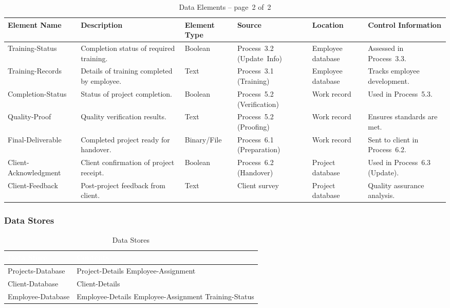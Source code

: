\documentclass[12pt,a4paper]{article}
\begin{document}
\newpage

\begin{table}[H]
\centering
\begin{tabular}{|p{2.8cm}|p{4cm}|p{1.8cm}|p{2.3cm}|p{1.8cm}|p{2.5cm}|}
\hline
\rowcolor{tableheader}
\textcolor{headertext}{\textbf{Element Name}} &
\textcolor{headertext}{\textbf{Description}} &
\textcolor{headertext}{\textbf{Element Type}} &
\textcolor{headertext}{\textbf{Source}} &
\textcolor{headertext}{\textbf{Location}} &
\textcolor{headertext}{\textbf{Control Information}} \\
\hline
Training-Status & Completion status of required training. & Boolean & Process 3.2 (Update Info) & Employee database & Assessed in Process 3.3. \\
\hline
Training-Records & Details of training completed by employee. & Text & Process 3.1 (Training) & Employee database & Tracks employee development. \\
\hline
Completion-Status & Status of project completion. & Boolean & Process 5.2 (Verification) & Work record & Used in Process 5.3. \\
\hline
Quality-Proof & Quality verification results. & Text & Process 5.2 (Proofing) & Work record & Ensures standards are met. \\
\hline
Final-Deliverable & Completed project ready for handover. & Binary/File & Process 6.1 (Preparation) & Work record & Sent to client in Process 6.2. \\
\hline
Client-Acknowledgment & Client confirmation of project receipt. & Boolean & Process 6.2 (Handover) & Project database & Used in Process 6.3 (Update). \\
\hline
Client-Feedback & Post-project feedback from client. & Text & Client survey & Project database & Quality assurance analysis. \\
\hline
\end{tabular}
\caption{Data Elements – page 2 of 2}
\label{tab:data_elements_part2}
\end{table}


\subsubsection{Data Stores}

\begin{table}[H]
\centering
\begin{tabular}{|p{4cm}|p{9cm}|}
\hline
\rowcolor{headercolor}
\textcolor{white}{\textbf{Data Store}} & \textcolor{white}{\textbf{Contents}} \\
\hline
Projects-Database & Project-Details \newline Employee-Assignment \\
\hline
Client-Database & Client-Details \\
\hline
Employee-Database & Employee-Details \newline Employee-Assignment \newline Training-Status \\
\hline
\end{tabular}
\caption{Data Stores}
\end{table}
\end{document}
